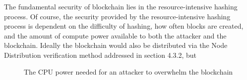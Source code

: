     The fundamental security of blockchain lies in the resource-intensive hashing process. Of course, the security provided by the resource-intensive hashing process is dependent on the difficulty of hashing, how often blocks are created, and the amount of compute power available to both the attacker and the blockchain. Ideally the blockchain would also be distributed via the Node Distribution verification method addressed in section 4.3.2, but 
    
    \begin{figure}[hbt!]
    \centering


    \caption{The CPU power needed for an attacker to overwhelm the blockchain }
    \label{fig:security}
\end{figure}

